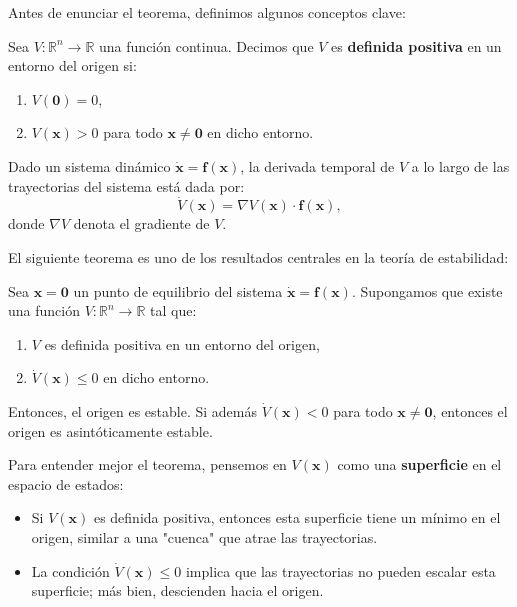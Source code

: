 Antes de enunciar el teorema, definimos algunos conceptos clave:

\begin{definition}
Sea $V: \mathbb{R}^n \to \mathbb{R}$ una función continua. Decimos que $V$ es \textbf{definida positiva} en un entorno del origen si:
\begin{enumerate}
    \item $V(\mathbf{0}) = 0$,
    \item $V(\mathbf{x}) > 0$ para todo $\mathbf{x} \neq \mathbf{0}$ en dicho entorno.
\end{enumerate}
\end{definition}

\begin{definition}
Dado un sistema dinámico $\dot{\mathbf{x}} = \mathbf{f}(\mathbf{x})$, la derivada temporal de $V$ a lo largo de las trayectorias del sistema está dada por:
\[
\dot{V}(\mathbf{x}) = \nabla V(\mathbf{x}) \cdot \mathbf{f}(\mathbf{x}),
\]
donde $\nabla V$ denota el gradiente de $V$.
\end{definition}

El siguiente teorema es uno de los resultados centrales en la teoría de estabilidad:

\begin{theorem}
Sea $\mathbf{x} = \mathbf{0}$ un punto de equilibrio del sistema $\dot{\mathbf{x}} = \mathbf{f}(\mathbf{x})$. Supongamos que existe una función $V: \mathbb{R}^n \to \mathbb{R}$ tal que:
\begin{enumerate}
    \item $V$ es definida positiva en un entorno del origen,
    \item $\dot{V}(\mathbf{x}) \leq 0$ en dicho entorno.
\end{enumerate}
Entonces, el origen es estable. Si además $\dot{V}(\mathbf{x}) < 0$ para todo $\mathbf{x} \neq \mathbf{0}$, entonces el origen es asintóticamente estable.
\end{theorem}

Para entender mejor el teorema, pensemos en $V(\mathbf{x})$ como una \textbf{superficie} en el espacio de estados:
\begin{itemize}
    \item Si $V(\mathbf{x})$ es definida positiva, entonces esta superficie tiene un mínimo en el origen, similar a una "cuenca" que atrae las trayectorias.
    \item La condición $\dot{V}(\mathbf{x}) \leq 0$ implica que las trayectorias no pueden escalar esta superficie; más bien, descienden hacia el origen.
\end{itemize}

